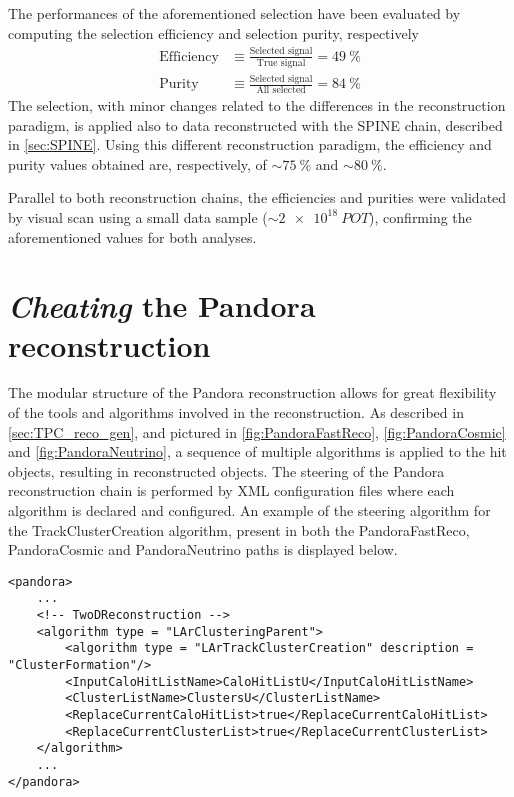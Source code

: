 The performances of the aforementioned selection have been  evaluated \cite{artero_pons_2024_13841852, particles8010018} by computing the selection efficiency and selection purity, respectively \begin{equation}
    \begin{aligned}
        \mathrm{Efficiency} &\equiv \frac{\text{Selected signal}}{\text{True signal}} = \SI{49}{\percent} \\
        \mathrm{Purity} &\equiv \frac{\text{Selected signal}}{\text{All selected}} = \SI{84}{\percent}
    \end{aligned}
\end{equation} The selection, with minor changes related to the differences in the reconstruction paradigm, is applied also to data reconstructed with the SPINE chain, described in \autoref{sec:SPINE}. Using this different reconstruction paradigm, the efficiency and purity values obtained are, respectively, of $\sim\SI{75}{\percent}$ and $\sim\SI{80}{\percent}$. 

Parallel to both reconstruction chains, the efficiencies and purities were validated by visual scan using a small data sample ($\sim\SI{2e18}{POT}$), confirming the aforementioned values for both analyses. 

\section{\emph{Cheating} the Pandora reconstruction} 

The modular structure of the Pandora reconstruction allows for great flexibility of the tools and algorithms involved in the reconstruction. As described in \autoref{sec:TPC_reco_gen}, and pictured in \autoref{fig:PandoraFastReco}, \ref{fig:PandoraCosmic} and \ref{fig:PandoraNeutrino}, a sequence of multiple algorithms is applied to the hit objects, resulting in reconstructed objects. The steering of the Pandora reconstruction chain is performed by XML configuration files where each algorithm is declared and configured. An example of the steering algorithm for the TrackClusterCreation algorithm, present in both the PandoraFastReco, PandoraCosmic and PandoraNeutrino paths is displayed below.

\begin{lstlisting}[style=xmlstyle]
<pandora>
    ...
    <!-- TwoDReconstruction -->
    <algorithm type = "LArClusteringParent">
        <algorithm type = "LArTrackClusterCreation" description = "ClusterFormation"/>
        <InputCaloHitListName>CaloHitListU</InputCaloHitListName>
        <ClusterListName>ClustersU</ClusterListName>
        <ReplaceCurrentCaloHitList>true</ReplaceCurrentCaloHitList>
        <ReplaceCurrentClusterList>true</ReplaceCurrentClusterList>
    </algorithm>
    ...
</pandora>
\end{lstlisting}

